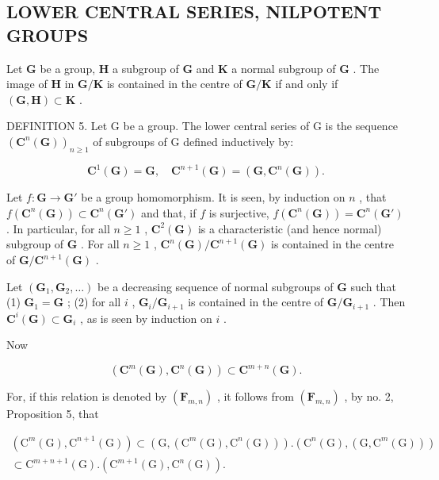 \subsection{LOWER CENTRAL SERIES, NILPOTENT GROUPS}

Let \(\mathbf{G}\) be a group, \(\mathbf{H}\) a subgroup of \(\mathbf{G}\) and \(\mathbf{K}\) a normal subgroup of \(\mathbf{G}\) . The image of \(\mathbf{H}\) in \(\mathbf{G} / \mathbf{K}\) is contained in the centre of \(\mathbf{G} / \mathbf{K}\) if and only if \((\mathbf{G}, \mathbf{H}) \subset \mathbf{K}\) .

DEFINITION 5. Let G be a group. The lower central series of G is the sequence \((\mathbf{C}^n (\mathbf{G}))_{n\geqslant 1}\) of subgroups of G defined inductively by:

\[
\mathbf {C} ^ {1} (\mathbf {G}) = \mathbf {G}, \quad \mathbf {C} ^ {n + 1} (\mathbf {G}) = (\mathbf {G}, \mathbf {C} ^ {n} (\mathbf {G})).
\]

Let \(f: \mathbf{G} \to \mathbf{G}'\) be a group homomorphism. It is seen, by induction on \(n\) , that \(f(\mathbf{C}^n(\mathbf{G})) \subset \mathbf{C}^n(\mathbf{G}')\) and that, if \(f\) is surjective, \(f(\mathbf{C}^n(\mathbf{G})) = \mathbf{C}^n(\mathbf{G}')\) . In particular, for all \(n \geqslant 1\) , \(\mathbf{C}^2(\mathbf{G})\) is a characteristic (and hence normal) subgroup of \(\mathbf{G}\) . For all \(n \geqslant 1\) , \(\mathbf{C}^n(\mathbf{G}) / \mathbf{C}^{n+1}(\mathbf{G})\) is contained in the centre of \(\mathbf{G} / \mathbf{C}^{n+1}(\mathbf{G})\) .

Let \((\mathbf{G}_1, \mathbf{G}_2, \ldots)\) be a decreasing sequence of normal subgroups of \(\mathbf{G}\) such that (1) \(\mathbf{G}_1 = \mathbf{G}\) ; (2) for all \(i\) , \(\mathbf{G}_i / \mathbf{G}_{i+1}\) is contained in the centre of \(\mathbf{G} / \mathbf{G}_{i+1}\) . Then \(\mathbf{C}^i(\mathbf{G}) \subset \mathbf{G}_i\) , as is seen by induction on \(i\) .

Now

\[
\left(\mathbf {C} ^ {m} (\mathbf {G}), \mathbf {C} ^ {n} (\mathbf {G})\right) \subset \mathbf {C} ^ {m + n} (\mathbf {G}).\tag{7}
\]

For, if this relation is denoted by \((\mathbf{F}_{m,n})\) , it follows from \((\mathbf{F}_{m,n})\) , by no. 2, Proposition 5, that

\[
\begin{array}{l} \left(\mathrm{C} ^ {m} (\mathrm{G}), \mathrm{C} ^ {n + 1} (\mathrm{G})\right) \subset \left(\mathrm{G}, \left(\mathrm{C} ^ {m} (\mathrm{G}), \mathrm{C} ^ {n} (\mathrm{G})\right)\right). \left(\mathrm{C} ^ {n} (\mathrm{G}), \left(\mathrm{G}, \mathrm{C} ^ {m} (\mathrm{G})\right)\right) \\ \subset \mathrm{C} ^ {m + n + 1} (\mathrm{G}). \left(\mathrm{C} ^ {m + 1} (\mathrm{G}), \mathrm{C} ^ {n} (\mathrm{G})\right). \end{array}
\]

